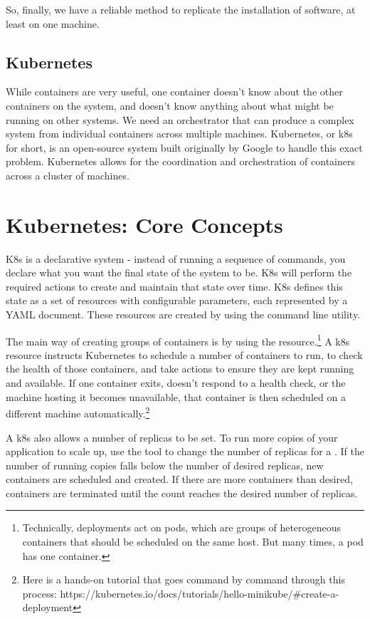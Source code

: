 \documentclass[11pt,twoside]{article}
\begin{document}
So, finally, we have a reliable method to replicate the installation of software,
at least on one machine.

\subsection{Kubernetes}

While containers are very useful, one container doesn't know about the other containers
on the system, and doesn't know anything about what might be running on other systems.
We need an orchestrator that can produce a complex system from individual containers
across multiple machines.  Kubernetes, or k8s for short, is an open-source system
built originally by Google to handle this exact problem.  Kubernetes allows for the
coordination and orchestration of containers across a cluster of machines.

\section{Kubernetes: Core Concepts}

K8s is a declarative system - instead of running
a sequence of commands, you declare what you want the final state of the system to be.
K8s will perform the required actions to create and maintain that state over time.
K8s defines this state as a set of resources with configurable parameters, each represented by a YAML document.
These resources are created by using the  command line utility.

The main way of creating groups of containers is by using the  resource.\footnote{
Technically, deployments act on pods, which are groups of heterogeneous containers that should be
scheduled on the same host.  But many times, a pod has one container.}
A k8s  resource instructs Kubernetes to schedule a number of containers to run,
to check the health of those containers,
and take actions to ensure they are kept running and available.  If one container exits, doesn't respond
to a health check, or the machine hosting it becomes unavailable, that container is then scheduled
on a different machine automatically.\footnote{
Here is a hands-on tutorial that goes command by command through this process:
https://kubernetes.io/docs/tutorials/hello-minikube/\#create-a-deployment}

A k8s  also allows a number of replicas to be set.  To run more copies of your application to
scale up, use the  tool to change the number of replicas for
a .  If the number of running copies falls below the number of desired replicas, new
containers are scheduled and created.  If there are more containers than desired, containers are terminated
until the count reaches the desired number of replicas.
\end{document}
